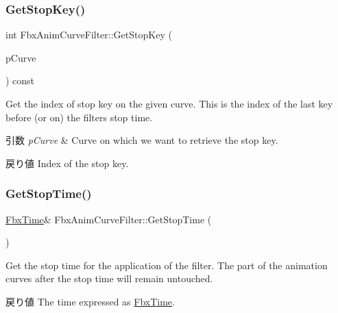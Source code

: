 \subsubsection{\texorpdfstring{Get\+Stop\+Key()}{GetStopKey()}}
{\footnotesize\ttfamily int Fbx\+Anim\+Curve\+Filter\+::\+Get\+Stop\+Key (\begin{DoxyParamCaption}\item[{\hyperlink{class_fbx_anim_curve}{Fbx\+Anim\+Curve} \&}]{p\+Curve }\end{DoxyParamCaption}) const}

Get the index of stop key on the given curve. This is the index of the last key before (or on) the filter\textquotesingle{}s stop time. 
\begin{DoxyParams}{引数}
{\em p\+Curve} & Curve on which we want to retrieve the stop key. \\
\hline
\end{DoxyParams}
\begin{DoxyReturn}{戻り値}
Index of the stop key. 
\end{DoxyReturn}
\mbox{\label{class_fbx_anim_curve_filter_afef1281c6f615676466c65ff8c7186a9}} 
\subsubsection{\texorpdfstring{Get\+Stop\+Time()}{GetStopTime()}}
{\footnotesize\ttfamily \hyperlink{class_fbx_time}{Fbx\+Time}\& Fbx\+Anim\+Curve\+Filter\+::\+Get\+Stop\+Time (\begin{DoxyParamCaption}{ }\end{DoxyParamCaption})}

Get the stop time for the application of the filter. The part of the animation curves after the stop time will remain untouched. \begin{DoxyReturn}{戻り値}
The time expressed as \hyperlink{class_fbx_time}{Fbx\+Time}. 
\end{DoxyReturn}
\mbox{\label{class_fbx_anim_curve_filter_af95af2469851b88b4f6d38401ace5791}} 
